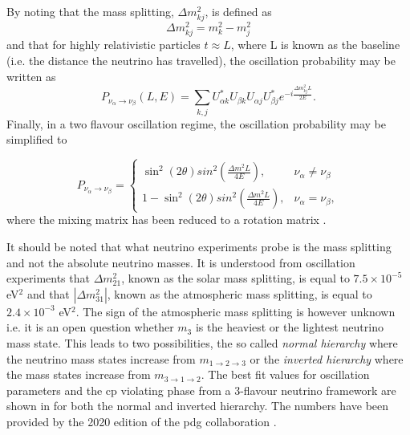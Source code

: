 By noting that the mass splitting, $\Delta m^2_{kj}$, is defined as 
\begin{equation}
    \Delta m^2_{kj} = m_k^2 - m_j^2
\end{equation}
and that for highly relativistic particles $t \approx L$, where L is known as the baseline (i.e. the distance the neutrino has travelled), the oscillation probability may be written as 
\begin{equation}
     P_{\nu_\alpha \rightarrow \nu_\beta}(L,E) = \sum_{k,j} U^*_{\alpha k} U_{\beta k} U_{\alpha j} U^*_{\beta j} e^{-i\frac{\Delta m^2_{kj}L}{2E}}.
\end{equation}
Finally, in a two flavour oscillation regime, the oscillation probability may be simplified to

\begin{equation}
  P_{\nu_\alpha \rightarrow \nu_\beta}=\begin{cases}
    \sin^2(2\theta)sin^2(\frac{\Delta m^2L}{4E}), & \nu_\alpha \neq \nu_\beta \\
    1 - \sin^2(2\theta)sin^2(\frac{\Delta m^2L}{4E}), & \nu_{\alpha} = \nu_{\beta},
  \end{cases}
\end{equation}
where the mixing matrix has been reduced to a rotation matrix \cite{Fundamentals_of_Neutrino_Physics_and_Astrophysics}. 

It should be noted that what neutrino experiments probe is the mass splitting and not the absolute neutrino masses. It is understood from oscillation experiments that $\Delta m_{21}^2$, known as the solar mass splitting, is equal to $7.5 \times 10^{-5}$ eV$^2$ and that $|\Delta m_{31}^2|$, known as the atmospheric mass splitting, is equal to $2.4 \times 10^{-3}$ eV$^2$. The sign of the atmospheric mass splitting is however unknown i.e. it is an open question whether $m_3$ is the heaviest or the lightest neutrino mass state. This leads to two possibilities, the so called \textit{normal hierarchy} where the neutrino mass states increase from $m_{1 \rightarrow 2 \rightarrow 3}$ or the \textit{inverted hierarchy} where the mass states increase from $m_{3 \rightarrow 1 \rightarrow 2}$. The best fit values for oscillation parameters and the \gls{cp} violating phase from a 3-flavour neutrino framework are shown in  for both the normal and inverted hierarchy. The numbers have been provided by the 2020 edition of the \gls{pdg} collaboration \cite{PDG_2020}. 

